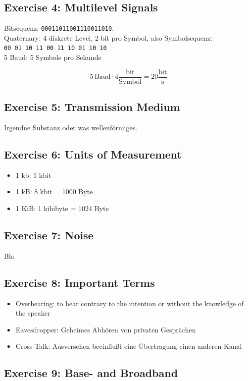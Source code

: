 \documentclass[10pt,a4paper]{scrartcl}
\begin{document}
\subsection*{Exercise 4: Multilevel Signals}
Bitsequenz: \texttt{00011011001110011010}.\\
Quaternary: 4 diskrete Level, 2 bit pro Symbol, also Symbolsequenz: \\
\texttt{00 01 10 11 00 11 10 01 10 10}\\
5 Baud: 5 Symbole pro Sekunde

\[ 5 \, \text{Baud} \cdot 4 \frac{\mathrm{bit}}{\mathrm{Symbol}} = 20 \frac{\mathrm{bit}}{\mathrm{s}}\]

\subsection*{Exercise 5: Transmission Medium}
Irgendne Substanz oder was wellenförmiges.

\subsection*{Exercise 6: Units of Measurement}

\begin{itemize}
\item 1 kb: 1 kbit
\item 1 kB: 8 kbit = 1000 Byte
\item 1 KiB: 1 kibibyte = 1024 Byte
\end{itemize}

\subsection*{Exercise 7: Noise}
Bla

\subsection*{Exercise 8: Important Terms}
\begin{itemize}
\item Overhearing: to hear contrary to the intention or without the knowledge of the speaker
\item Eavesdropper: Geheimes Abhören von privaten Gesprächen
\item Cross-Talk: Ausversehen beeinflußt eine Übertragung einen anderen Kanal
\end{itemize}

\subsection*{Exercise 9: Base- and Broadband}
\end{document}
